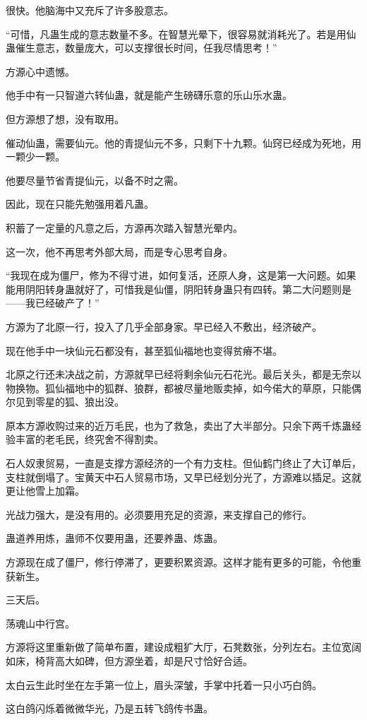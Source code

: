 \begin{this_body}
很快。他脑海中又充斥了许多股意志。

“可惜，凡蛊生成的意志数量不多。在智慧光晕下，很容易就消耗光了。若是用仙蛊催生意志，数量庞大，可以支撑很长时间，任我尽情思考！”

方源心中遗憾。

他手中有一只智道六转仙蛊，就是能产生磅礴乐意的乐山乐水蛊。

但方源想了想，没有取用。

催动仙蛊，需要仙元。他的青提仙元不多，只剩下十九颗。仙窍已经成为死地，用一颗少一颗。

他要尽量节省青提仙元，以备不时之需。

因此，现在只能先勉强用着凡蛊。

积蓄了一定量的凡意之后，方源再次踏入智慧光晕内。

这一次，他不再思考外部大局，而是专心思考自身。

“我现在成为僵尸，修为不得寸进，如何复活，还原人身，这是第一大问题。如果能用阴阳转身蛊就好了，可惜我是仙僵，阴阳转身蛊只有四转。第二大问题则是——我已经破产了！”

方源为了北原一行，投入了几乎全部身家。早已经入不敷出，经济破产。

现在他手中一块仙元石都没有，甚至狐仙福地也变得贫瘠不堪。

北原之行还未决战之前，方源就早已经将剩余仙元石花光。最后关头，都是无奈以物换物。狐仙福地中的狐群、狼群，都被尽量地贩卖掉，如今偌大的草原，只能偶尔见到零星的狐、狼出没。

原本方源收购过来的近万毛民，也为了救急，卖出了大半部分。只余下两千炼蛊经验丰富的老毛民，终究舍不得割卖。

石人奴隶贸易，一直是支撑方源经济的一个有力支柱。但仙鹤门终止了大订单后，支柱就倒塌了。宝黄天中石人贸易市场，又早已经划分光了，方源难以插足。这就更让他雪上加霜。

光战力强大，是没有用的。必须要用充足的资源，来支撑自己的修行。

蛊道养用炼，蛊师不仅要用蛊，还要养蛊、炼蛊。

方源现在成了僵尸，修行停滞了，更要积累资源。这样才能有更多的可能，令他重获新生。

三天后。

荡魂山中行宫。

方源将这里重新做了简单布置，建设成粗犷大厅，石凳数张，分列左右。主位宽阔如床，椅背高大如碑，但方源坐着，却是尺寸恰好合适。

太白云生此时坐在左手第一位上，眉头深皱，手掌中托着一只小巧白鸽。

这白鸽闪烁着微微华光，乃是五转飞鸽传书蛊。


\end{this_body}
